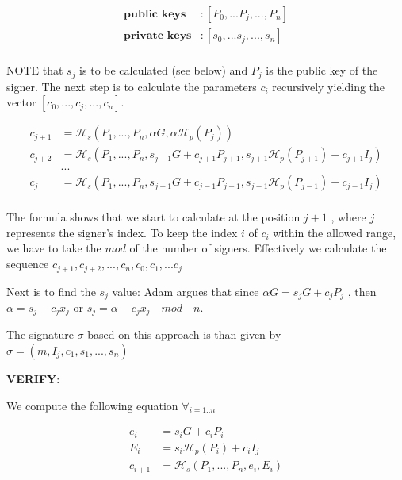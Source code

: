 \begin{equation}
\begin{split}
\textbf{public keys} &: [P_0, ... P_j, ..., P_n] \\
\textbf{private keys} &: [s_0, ... s_j, ..., s_n] \\
\end{split}
\end{equation}

\hfill \break NOTE that $s_j$ is to be calculated (see below) and $P_j$ 
is the public key of the signer. The next step is to calculate the parameters 
$c_i$ recursively yielding the vector $[c_0, ... ,c_j, ..., c_n]$.

\begin{equation}
\begin{split}
  c_{j+1} & = \mathcal{H}_s(P_1, ..., P_n, \alpha G, \alpha \mathcal{H}_p(P_j))\\
  c_{j+2} & = \mathcal{H}_s(P_1,...,P_n,s_{j+1}G+c_{j+1}P_{j+1},s_{j+1}\mathcal{H}_p(P_{j+1})+c_{j+1}I_j)\\
	      & ... \\
  c_{j} & = \mathcal{H}_s(P_1,...,P_n,s_{j-1}G+c_{j-1}P_{j-1},s_{j-1}\mathcal{H}_p(P_{j-1})+c_{j-1}I_j) \\
\end{split}
\end{equation}

\hfill \break The formula shows that we start to calculate at the position 
$j+1$ , where $j$ represents the signer's index. To keep the index $i$ of 
$c_i$ within the allowed range, we have to take the $mod$ of the number of 
signers. Effectively we calculate the sequence 
$c_{j+1}, c_{j+2}, ..., c_n, c_0, c_1, ... c_j$
 
\hfill \break Next is to find the $s_j$ value: Adam argues that since 
$\alpha G = s_jG+c_jP_j$ , then $\alpha = s_j+c_jx_j$ or 
$s_j = \alpha - c_jx_j\quad mod\quad n.$

\hfill \break The signature $\sigma$ based on this approach is than given 
by $\sigma = (m,I_j,c_1,s_1,...,s_n)$

\hfill \break\textbf{VERIFY}: 

We compute the following equation $\forall_{i=1..n}$

\begin{equation}
\begin{split}
 e_i &= s_iG+c_iP_i \\
 E_i &= s_i\mathcal{H}_p(P_i)+c_iI_j \\
 c_{i+1} &=\mathcal{H}_s(P_1,...,P_n,e_i,E_i)
\end{split}
\end{equation}

